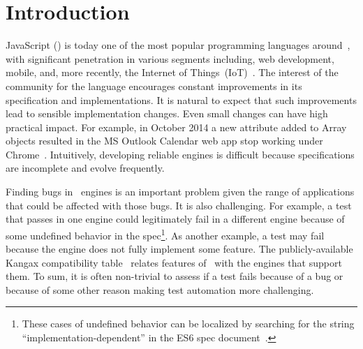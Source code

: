 \documentclass[10pt,conference,anonymous]{IEEEtran}
\begin{document}
\section{Introduction}

JavaScript (\js{}) is today one of the most popular programming
languages around~\cite{business-insider,stackify}, with significant
penetration in various segments including, web development, mobile,
and, more recently, the Internet of
Things~(IoT)~\cite{simply-technologies}. The interest of the community
for the language encourages constant improvements in its specification
and implementations. It is natural to expect that such improvements
lead to sensible implementation changes. Even small changes can have
high practical impact. For example, in October 2014 a new attribute
added to Array objects resulted in the MS Outlook Calendar web app
stop working under
Chrome~\cite{array-bug-chromium-issue4247,array-bug-discussion}.
Intuitively, developing reliable engines is difficult because
specifications are incomplete and evolve frequently.


Finding bugs in \js\ engines is an important problem given the range
of applications that could be affected with those
bugs. It is also
challenging. For example, a test that passes in one engine could
legitimately fail in a different engine because of some undefined
behavior in the spec\footnote{These cases of undefined behavior can be
  localized by searching for the string ``implementation-dependent''
  in the ES6 spec document~\cite{ecmas262-spec}.}. As another example,
a test may fail because the engine does not fully implement some
feature. The publicly-available Kangax compatibility
table~\cite{kangax} relates features of \js\ with the engines that
support them. To sum, it is often non-trivial to assess if a test
fails because of a bug or because of some other reason making test
automation more challenging.

\end{document}
